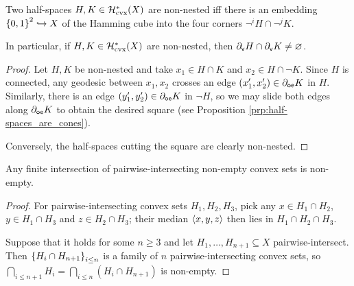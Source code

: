 \documentclass[reqno]{amsart}
\begin{document}
    \begin{corollary}\label{cor:non-nested_iff_embedding_of_hamming}
        Two half-spaces $H,K\in\mathcal{H}_\mathrm{cvx}^\ast(X)$ are non-nested iff there is an embedding $\left\{0,1\right\}^2\hookrightarrow X$ of the Hamming cube into the four corners $\lnot^iH\cap\lnot^jK$.

        In particular, if $H,K\in\mathcal{H}_\mathrm{cvx}^\ast(X)$ are non-nested, then $\partial_\mathsf{v}H\cap\partial_\mathsf{v}K\neq\varnothing$.
    \end{corollary}
    \begin{proof}
        Let $H,K$ be non-nested and take $x_1\in H\cap K$ and $x_2\in H\cap\lnot K$. Since $H$ is connected, any geodesic between $x_1,x_2$ crosses an edge $(x_1',x_2')\in\partial_\mathsf{oe}K$ in $H$. Similarly, there is an edge $(y_1',y_2')\in\partial_\mathsf{oe}K$ in $\lnot H$, so we may slide both edges along $\partial_\mathsf{oe}K$ to obtain the desired square (see Proposition \ref{prp:half-spaces_are_cones}).

        Conversely, the half-spaces cutting the square are clearly non-nested.
    \end{proof}


    \begin{lemma}[Helly]\label{lem:helly}
        Any finite intersection of pairwise-intersecting non-empty convex sets is non-empty.
    \end{lemma}
    \begin{proof}
        For pairwise-intersecting convex sets $H_1,H_2,H_3$, pick any $x\in H_1\cap H_2$, $y\in H_1\cap H_3$ and $z\in H_2\cap H_3$; their median $\left\langle x,y,z\right\rangle$ then lies in $H_1\cap H_2\cap H_3$.

        Suppose that it holds for some $n\geq 3$ and let $H_1,\dots,H_{n+1}\subseteq X$ pairwise-intersect. Then $\left\{H_i\cap H_{n+1}\right\}_{i\leq n}$ is a family of $n$ pairwise-intersecting convex sets, so $\bigcap_{i\leq n+1}H_i=\bigcap_{i\leq n}(H_i\cap H_{n+1})$ is non-empty.
    \end{proof}
\end{document}
